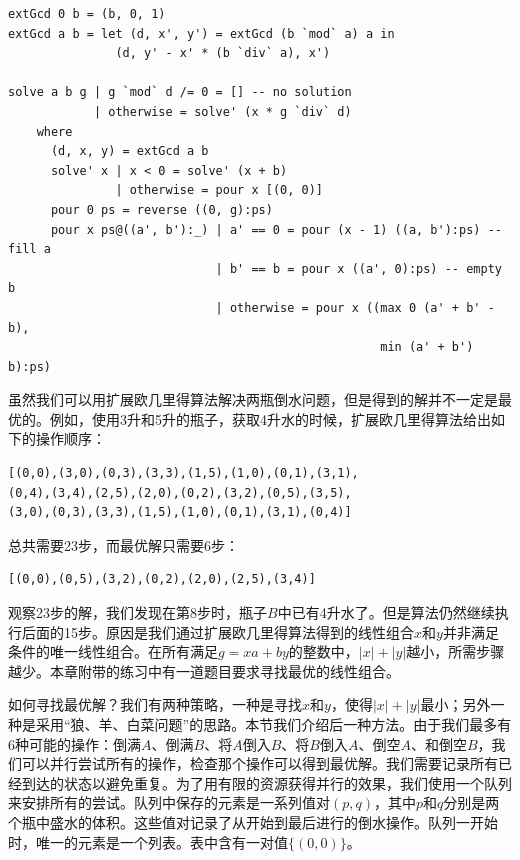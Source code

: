 \documentclass[UTF8]{article}
\begin{document}
\lstset{language=Haskell}
\begin{lstlisting}
extGcd 0 b = (b, 0, 1)
extGcd a b = let (d, x', y') = extGcd (b `mod` a) a in
               (d, y' - x' * (b `div` a), x')

solve a b g | g `mod` d /= 0 = [] -- no solution
            | otherwise = solve' (x * g `div` d)
    where
      (d, x, y) = extGcd a b
      solve' x | x < 0 = solve' (x + b)
               | otherwise = pour x [(0, 0)]
      pour 0 ps = reverse ((0, g):ps)
      pour x ps@((a', b'):_) | a' == 0 = pour (x - 1) ((a, b'):ps) -- fill a
                             | b' == b = pour x ((a', 0):ps) -- empty b
                             | otherwise = pour x ((max 0 (a' + b' - b),
                                                    min (a' + b') b):ps)
\end{lstlisting}

虽然我们可以用扩展欧几里得算法解决两瓶倒水问题，但是得到的解并不一定是最优的。例如，使用3升和5升的瓶子，获取4升水的时候，扩展欧几里得算法给出如下的操作顺序：

\begin{verbatim}
[(0,0),(3,0),(0,3),(3,3),(1,5),(1,0),(0,1),(3,1),
(0,4),(3,4),(2,5),(2,0),(0,2),(3,2),(0,5),(3,5),
(3,0),(0,3),(3,3),(1,5),(1,0),(0,1),(3,1),(0,4)]
\end{verbatim}

总共需要23步，而最优解只需要6步：

\begin{verbatim}
[(0,0),(0,5),(3,2),(0,2),(2,0),(2,5),(3,4)]
\end{verbatim}

观察23步的解，我们发现在第8步时，瓶子$B$中已有4升水了。但是算法仍然继续执行后面的15步。原因是我们通过扩展欧几里得算法得到的线性组合$x$和$y$并非满足条件的唯一线性组合。在所有满足$g = x a + b y$的整数中，$|x| + |y|$越小，所需步骤越少。本章附带的练习中有一道题目要求寻找最优的线性组合。

如何寻找最优解？我们有两种策略，一种是寻找$x$和$y$，使得$|x| + |y|$最小；另外一种是采用“狼、羊、白菜问题”的思路。本节我们介绍后一种方法。由于我们最多有6种可能的操作：倒满$A$、倒满$B$、将$A$倒入$B$、将$B$倒入$A$、倒空$A$、和倒空$B$，我们可以并行尝试所有的操作，检查那个操作可以得到最优解。我们需要记录所有已经到达的状态以避免重复。为了用有限的资源获得并行的效果，我们使用一个队列来安排所有的尝试。队列中保存的元素是一系列值对$(p, q)$，其中$p$和$q$分别是两个瓶中盛水的体积。这些值对记录了从开始到最后进行的倒水操作。队列一开始时，唯一的元素是一个列表。表中含有一对值$\{ (0, 0) \}$。
\end{document}
